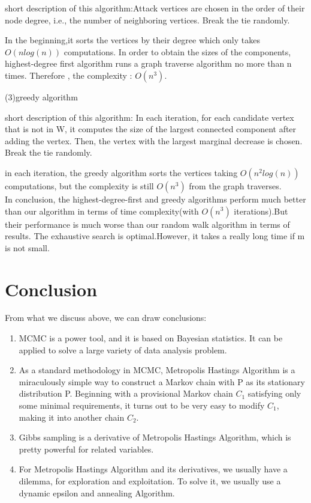 \documentclass[10pt,journal]{IEEEtran}
\begin{document}
short description of this algorithm:Attack vertices are chosen in the order of their node degree, i.e., the number
of neighboring vertices. Break the tie randomly.

In the beginning,it sorts the vertices by their degree which only takes
$O(nlog (n))$ computations. In order to obtain the sizes of the components, highest-degree first algorithm  runs a graph traverse algorithm no more than n times. Therefore , the complexity : $O
(n^3)$. 

(3)greedy algorithm 

short description of this algorithm: In each iteration, for each candidate vertex that is not in W, it computes the size of the largest connected component after adding the vertex. Then, the
vertex with the largest marginal decrease is chosen. Break the tie randomly.

in each iteration, the greedy algorithm sorts the vertices taking $O(n^2log (n))$ computations, but the complexity is still $O(n^3)$ from the graph traverses. 
\\

In conclusion, the highest-degree-first and greedy algorithms perform much better than our algorithm in terms of time complexity(with $O(n^3)$ iterations).But their performance is much worse than our random
walk algorithm in terms of results. The exhaustive search is optimal.However, it takes a really long
time if m is not small.

\section{Conclusion}
From what we discuss above, we can draw conclusions:
\begin{enumerate}
\item
MCMC is a power tool, and it is based on Bayesian statistics. It can be applied to solve a large variety of data analysis problem.

\item As a standard methodology in MCMC, Metropolis Hastings Algorithm is a miraculously simple way to construct a Markov chain with P as its stationary distribution P. Beginning with a provisional Markov chain $C_1$ satisfying only some minimal requirements, it turns out to be very easy to modify $C_1$, making it into another chain $C_2$. 

\item Gibbs sampling is a derivative of Metropolis Hastings Algorithm, which is pretty powerful for related variables.

\item For Metropolis Hastings Algorithm and its derivatives, we usually have a dilemma, for exploration and exploitation. To solve it, we usually use a dynamic epsilon and annealing Algorithm.
\end{enumerate}
\ifCLASSOPTIONcompsoc
\end{document}
